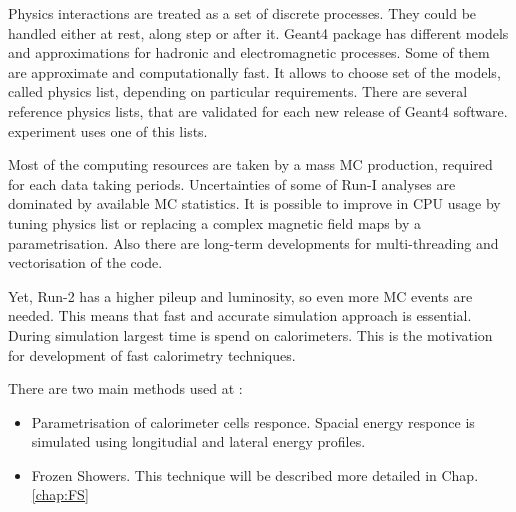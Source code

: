 Physics interactions are treated as a set of discrete processes. They could be handled either at rest, along step or after it. Geant4 package has different models and approximations for hadronic and electromagnetic processes. Some of them are approximate and computationally fast. It allows to choose set of the models, called physics list, depending on particular requirements. There are several reference physics lists, that are validated for each new release of Geant4 software. \atlas experiment uses one of this lists.

Most of the computing resources are taken by a mass MC production, required for each data taking periods. Uncertainties of some of Run-I analyses are dominated by available MC statistics. It is possible to improve in CPU usage by tuning physics list or replacing a complex magnetic field maps by a parametrisation. Also there are long-term developments for multi-threading and vectorisation of the code. 

Yet, Run-2 has a higher pileup and luminosity, so even more MC events are needed. This means that fast and accurate simulation approach is essential. During simulation largest time is spend on calorimeters. This is the motivation for development of fast calorimetry techniques.  

There are two main methods used at \atlas:
\begin{itemize}
\item Parametrisation of calorimeter cells responce. Spacial energy responce is simulated using longitudial and lateral energy profiles.
\item Frozen Showers. This technique will be described more detailed in Chap. \ref{chap:FS}
\end{itemize}

